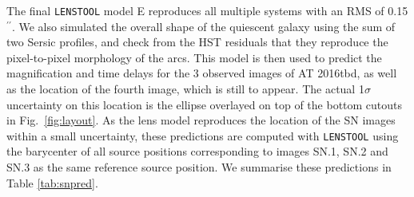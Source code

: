 \documentclass[12pt]{article}
\gdef\arcsec{$^{\prime\prime}$}
\def\SNABC{AT 2016tbd\xspace}
\def\lenstool{{\tt LENSTOOL}\xspace}
\begin{document}
The final \lenstool model E reproduces all multiple systems with an RMS of 0.15\arcsec. We also simulated the overall shape of the quiescent galaxy using the sum of two Sersic profiles, and check from the HST residuals that they reproduce the pixel-to-pixel morphology of the arcs. This model is then used to predict the magnification and time delays for the 3 observed images of \SNABC, as well as the location of the fourth  image, which is still to appear. The actual 1$\sigma$ uncertainty on this location is the ellipse overlayed on top of the bottom cutouts in Fig.~\ref{fig:layout}. As the lens model reproduces the location of the SN images within a small uncertainty, these predictions are computed with \lenstool using the barycenter of all source positions corresponding to images SN.1, SN.2 and SN.3 as the same reference source position. We summarise these predictions in Table \ref{tab:snpred}.
\end{document}
